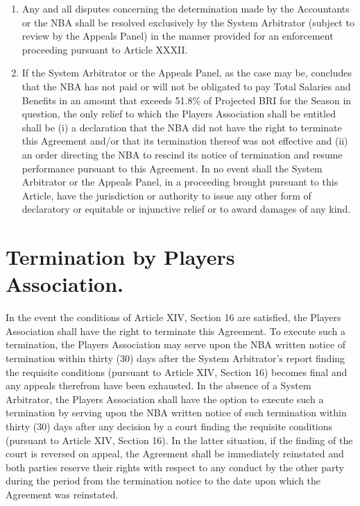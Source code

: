 \documentclass[
]{book}
\begin{document}
\begin{enumerate}
\item
  Any and all disputes concerning the determination made by the Accountants or the NBA shall be resolved exclusively by the System Arbitrator (subject to review by the Appeals Panel) in the manner provided for an enforcement proceeding pursuant to Article XXXII.
\item
  If the System Arbitrator or the Appeals Panel, as the case may be, concludes that the NBA has not paid or will not be obligated to pay Total Salaries and Benefits in an amount that exceeds 51.8\% of Projected BRI for the Season in question, the only relief to which the Players Association shall be entitled shall be (i) a declaration that the NBA did not have the right to terminate this Agreement and/or that its termination thereof was not effective and (ii) an order directing the NBA to rescind its notice of termination and resume performance pursuant to this Agreement. In no event shall the System Arbitrator or the Appeals Panel, in a proceeding brought pursuant to this Article, have the jurisdiction or authority to issue any other form of declaratory or equitable or injunctive relief or to award damages of any kind.
\end{enumerate}

\hypertarget{termination-by-players-association.}{%
\section{Termination by Players Association.}\label{termination-by-players-association.}}

In the event the conditions of Article XIV, Section 16 are satisfied, the Players Association shall have the right to terminate this Agreement. To execute such a termination, the Players Association may serve upon the NBA written notice of termination within thirty (30) days after the System Arbitrator's report finding the requisite conditions (pursuant to Article XIV, Section 16) becomes final and any appeals therefrom have been exhausted. In the absence of a System Arbitrator, the Players Association shall have the option to execute such a termination by serving upon the NBA written notice of such termination within thirty (30) days after any decision by a court finding the requisite conditions (pursuant to Article XIV, Section 16). In the latter situation, if the finding of the court is reversed on appeal, the Agreement shall be immediately reinstated and both parties reserve their rights with respect to any conduct by the other party during the period from the termination notice to the date upon which the Agreement was reinstated.
\end{document}
